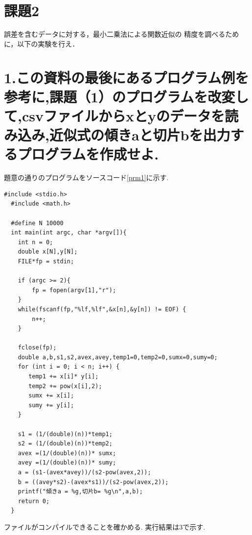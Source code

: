 \documentclass[a4j,10pt,dvipdfmx]{jarticle}
\author{学籍番号2120029, 氏名 政野玄空}
\date{2023年7月7日}
\begin{document}
\section{課題2}
誤差を含むデータに対する，最小二乗法による関数近似の
精度を調べるために，以下の実験を行え．

\section{1.この資料の最後にあるプログラム例を参考に,課題（1）のプログラムを改変して,csvファイルからxとyのデータを読み込み,近似式の傾きaと切片bを出力するプログラムを作成せよ.}
題意の通りのプログラムをソースコード\ref{prm1}に示す.
\begin{lstlisting}[label=prm1, caption=approximate.c]
  #include <stdio.h>
  #include <math.h>

  #define N 10000
  int main(int argc, char *argv[]){
    int n = 0;
    double x[N],y[N];
    FILE*fp = stdin;

    if (argc >= 2){
        fp = fopen(argv[1],"r");
    }
    while(fscanf(fp,"%lf,%lf",&x[n],&y[n]) != EOF) {
        n++;
    }

    fclose(fp);
    double a,b,s1,s2,avex,avey,temp1=0,temp2=0,sumx=0,sumy=0;
    for (int i = 0; i < n; i++) {
       temp1 += x[i]* y[i];
       temp2 += pow(x[i],2);
       sumx += x[i];
       sumy += y[i];
    }
 
    s1 = (1/(double)(n))*temp1;
    s2 = (1/(double)(n))*temp2;
    avex =(1/(double)(n))* sumx;
    avey =(1/(double)(n))* sumy;
    a = (s1-(avex*avey))/(s2-pow(avex,2));
    b = ((avey*s2)-(avex*s1))/(s2-pow(avex,2));
    printf("傾きa = %g,切片b= %g\n",a,b);
    return 0;
  }
\end{lstlisting}
ファイルがコンパイルできることを確かめる.
実行結果は3で示す.
\end{document}
